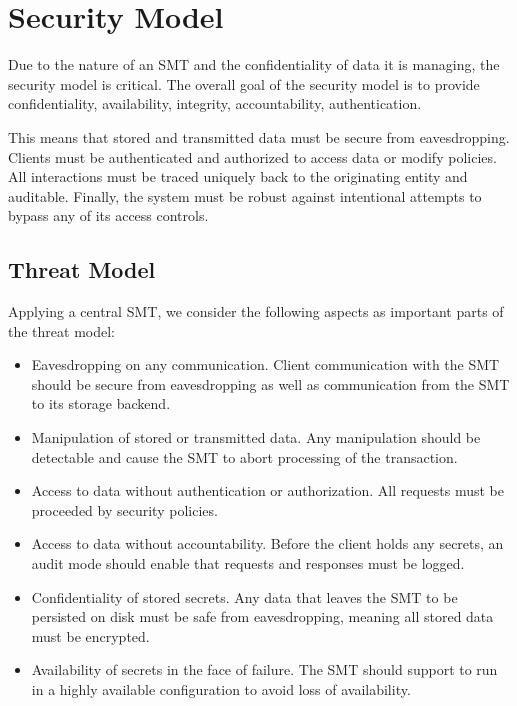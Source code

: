 \documentclass[runningheads]{llncs}
\begin{document}
\section{Security Model}

Due to the nature of an SMT and the confidentiality of data it is managing, the security model is critical. The overall goal of the security model is to provide confidentiality, availability, integrity, accountability, authentication.

This means that stored and transmitted data must be secure from eavesdropping. Clients must be authenticated and authorized to access data or modify policies. All interactions must be traced uniquely back to the originating entity and auditable. Finally, the system must be robust against intentional attempts to bypass any of its access controls.

\subsection{Threat Model}

Applying a central SMT, we consider the following aspects as important parts of the threat model:

\begin{itemize}
\setlength\itemsep{1mm}
\item Eavesdropping on any communication. Client communication with the SMT should be secure from eavesdropping as well as communication from the SMT to its storage backend.

\item Manipulation of stored or transmitted data. Any manipulation should be detectable and cause the SMT to abort processing of the transaction.

\item Access to data without authentication or authorization. All requests must be proceeded by security policies.

\item Access to data without accountability. Before the client holds any secrets, an audit mode should enable that requests and responses must be logged.

\item Confidentiality of stored secrets. Any data that leaves the SMT to be persisted on disk must be safe from eavesdropping, meaning all stored data must be encrypted.

\item Availability of secrets in the face of failure. The SMT should support to run in a highly available configuration to avoid loss of availability.
\end{itemize}
\end{document}
